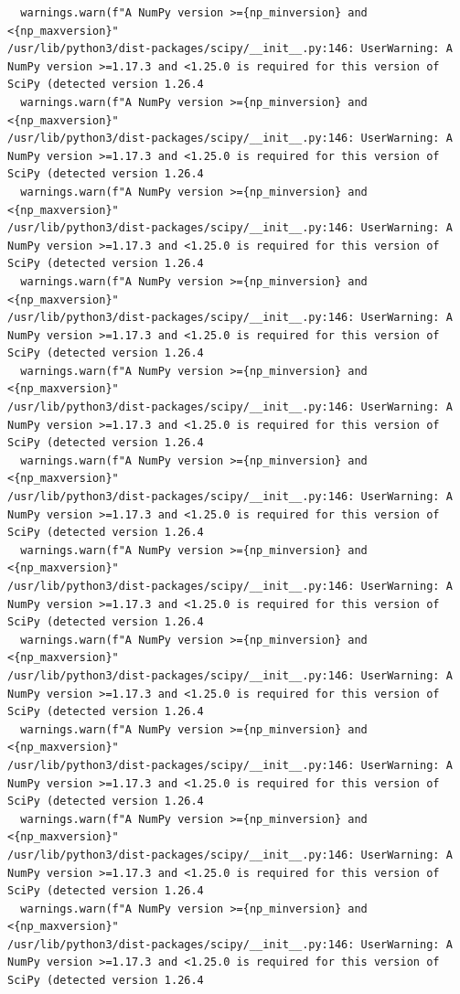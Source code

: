 \documentclass[11pt]{article}
\begin{document}
\begin{verbatim}
  warnings.warn(f"A NumPy version >={np_minversion} and <{np_maxversion}"
/usr/lib/python3/dist-packages/scipy/__init__.py:146: UserWarning: A NumPy version >=1.17.3 and <1.25.0 is required for this version of SciPy (detected version 1.26.4
  warnings.warn(f"A NumPy version >={np_minversion} and <{np_maxversion}"
/usr/lib/python3/dist-packages/scipy/__init__.py:146: UserWarning: A NumPy version >=1.17.3 and <1.25.0 is required for this version of SciPy (detected version 1.26.4
  warnings.warn(f"A NumPy version >={np_minversion} and <{np_maxversion}"
/usr/lib/python3/dist-packages/scipy/__init__.py:146: UserWarning: A NumPy version >=1.17.3 and <1.25.0 is required for this version of SciPy (detected version 1.26.4
  warnings.warn(f"A NumPy version >={np_minversion} and <{np_maxversion}"
/usr/lib/python3/dist-packages/scipy/__init__.py:146: UserWarning: A NumPy version >=1.17.3 and <1.25.0 is required for this version of SciPy (detected version 1.26.4
  warnings.warn(f"A NumPy version >={np_minversion} and <{np_maxversion}"
/usr/lib/python3/dist-packages/scipy/__init__.py:146: UserWarning: A NumPy version >=1.17.3 and <1.25.0 is required for this version of SciPy (detected version 1.26.4
  warnings.warn(f"A NumPy version >={np_minversion} and <{np_maxversion}"
/usr/lib/python3/dist-packages/scipy/__init__.py:146: UserWarning: A NumPy version >=1.17.3 and <1.25.0 is required for this version of SciPy (detected version 1.26.4
  warnings.warn(f"A NumPy version >={np_minversion} and <{np_maxversion}"
/usr/lib/python3/dist-packages/scipy/__init__.py:146: UserWarning: A NumPy version >=1.17.3 and <1.25.0 is required for this version of SciPy (detected version 1.26.4
  warnings.warn(f"A NumPy version >={np_minversion} and <{np_maxversion}"
/usr/lib/python3/dist-packages/scipy/__init__.py:146: UserWarning: A NumPy version >=1.17.3 and <1.25.0 is required for this version of SciPy (detected version 1.26.4
  warnings.warn(f"A NumPy version >={np_minversion} and <{np_maxversion}"
/usr/lib/python3/dist-packages/scipy/__init__.py:146: UserWarning: A NumPy version >=1.17.3 and <1.25.0 is required for this version of SciPy (detected version 1.26.4
  warnings.warn(f"A NumPy version >={np_minversion} and <{np_maxversion}"
/usr/lib/python3/dist-packages/scipy/__init__.py:146: UserWarning: A NumPy version >=1.17.3 and <1.25.0 is required for this version of SciPy (detected version 1.26.4
  warnings.warn(f"A NumPy version >={np_minversion} and <{np_maxversion}"
/usr/lib/python3/dist-packages/scipy/__init__.py:146: UserWarning: A NumPy version >=1.17.3 and <1.25.0 is required for this version of SciPy (detected version 1.26.4

\end{verbatim}
\end{document}
